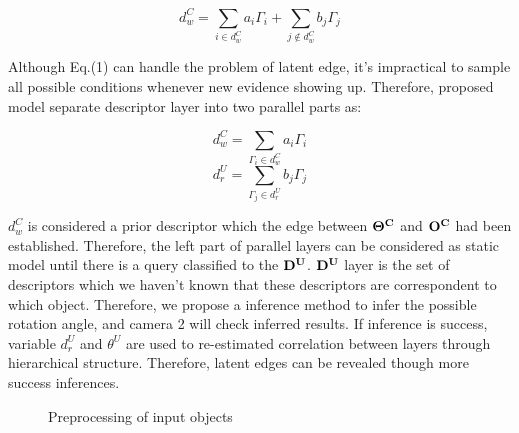 \documentclass[journal]{IEEEtran}
\begin{document}
\begin{equation}
d^C_w=\sum_{i\in{d^C_w}}a_{i}\Gamma_{i}+\sum_{j\notin{d^C_w}}b_{j}\Gamma_{j}
\end{equation}

Although Eq.(1) can handle the problem of latent edge, it's impractical to sample all possible conditions whenever new evidence showing up. Therefore, proposed model separate descriptor layer into two parallel parts as: 

\begin{equation}
d^C_w=\sum_{\Gamma_{i}\in{d^C_w}}a_{i}\Gamma_{i}
\end{equation}
\begin{equation}
d^U_r=\sum_{\Gamma_{j}\in{d^U_r}}b_{j}\Gamma_{j}
\end{equation}

$d^C_w$ is considered a prior descriptor which the edge between $\bf{\Theta^{C}}$ and $\bf{O^C}$ had been established. Therefore, the left part of parallel layers can be considered as static model until there is a query classified to the $\bf{D^U}$. $\bf{D^U}$ layer is the set of descriptors which we haven't known that these descriptors are correspondent to which object. Therefore, we propose a inference method to infer the possible rotation angle, and camera 2 will check inferred results. If inference is success, variable $d^U_r$ and $\theta^{U}$ are used to re-estimated correlation between layers through hierarchical structure. Therefore, latent edges can be revealed though more success inferences.

\begin{figure}[!t]
\begin{center}
\caption{Preprocessing of input objects}\label{test}
\end{center}
\end{figure}
\end{document}

